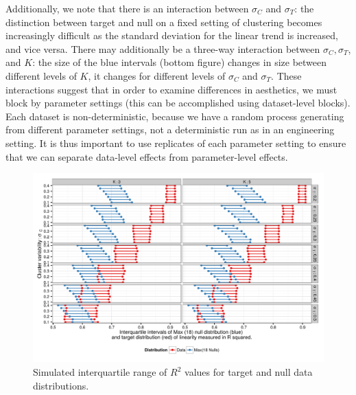 \documentclass[11pt]{isuthesis}\usepackage[]{graphicx}\usepackage[]{color}
\newenvironment{knitrout}{}{} %
\begin{document}
Additionally, we note that there is an interaction between $\sigma_C$ and $\sigma_T$: the distinction between target and null on a fixed setting of clustering becomes increasingly difficult as the standard deviation for the linear trend is increased, and vice versa. There may additionally be a three-way interaction between $\sigma_C, \sigma_T$, and $K$: the size of the blue intervals (bottom figure) changes in size between different levels of $K$, it changes for different levels of $\sigma_C$ and $\sigma_T$. These interactions suggest that in order to examine differences in aesthetics, we must block by parameter settings (this can be accomplished using dataset-level blocks). Each dataset is non-deterministic, because we have a random process generating from different parameter settings, not a deterministic run as in an engineering setting. It is thus important to use replicates of each parameter setting to ensure that we can separate data-level effects from parameter-level effects. 



\begin{figure}[ht]\centering
\begin{knitrout}
\color{fgcolor}

{\centering \includegraphics[width=.8\linewidth]{Figure/FeatureHierarchy/fig-simulationparameters-r2-1} 

}



\end{knitrout}
\caption[Simulated IQR of $R^2$ values]{Simulated interquartile range of $R^2$ values for target and null data distributions. \label{fig:simulationLineIntervals}}
\end{figure}
\end{document}
